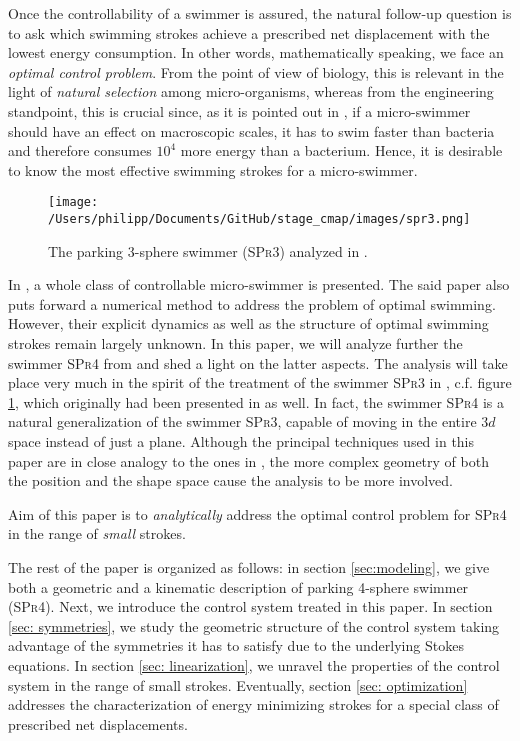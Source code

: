 Once the controllability of a swimmer is assured, the natural follow-up question is to ask which swimming strokes achieve a prescribed net displacement with the lowest energy consumption. In other words, mathematically speaking, we face an \emph{optimal control problem}. From the point of view of biology, this is relevant in the light of \emph{natural selection} among micro-organisms, whereas from the engineering standpoint, this is crucial since, as it is pointed out in \cite{Avron2004}, if a micro-swimmer should have an effect on macroscopic scales, it has to swim faster than bacteria and therefore consumes $10^4$ more energy than a bacterium. Hence, it is desirable to know the most effective swimming strokes for a micro-swimmer.

\begin{figure}[h]
\centering
	\texttt{[image: /Users/philipp/Documents/GitHub/stage\_cmap/images/spr3.png]}
    \caption{The parking 3-sphere swimmer (\textsc{SPr3}) analyzed in \cite{Alouges2017}.}
    \label{fig:spr3}
\end{figure}

In \cite{Alouges2013}, a whole class of controllable micro-swimmer is presented. The said paper also puts forward a numerical method to address the problem of optimal swimming. However, their explicit dynamics as well as the structure of optimal swimming strokes remain largely unknown. In this paper, we will analyze further the swimmer \textsc{SPr4} from \cite{Alouges2013} and shed a light on the latter aspects. The analysis will take place very much in the spirit of the treatment of the swimmer \textsc{SPr3} in \cite{Alouges2017}, c.f. figure \ref{fig:spr3}, which originally had been presented in \cite{Alouges2013} as well. In fact, the swimmer \textsc{SPr4} is a natural generalization of the swimmer \textsc{SPr3}, capable of moving in the entire $3d$ space instead of just a plane. Although the principal techniques used in this paper are in close analogy to the ones in \cite{Alouges2017}, the more complex geometry of both the position and the shape space cause the analysis to be more involved.

Aim of this paper is to \emph{analytically} address the optimal control problem for \textsc{SPr4} in the range of \emph{small} strokes.

The rest of the paper is organized as follows: in section \ref{sec:modeling}, we give both a geometric and a kinematic description of parking 4-sphere swimmer (\textsc{SPr4}). Next, we introduce the control system treated in this paper. In section \ref{sec: symmetries}, we study the geometric structure of the control system taking advantage of the symmetries it has to satisfy due to the underlying Stokes  equations. In section \ref{sec: linearization}, we unravel the properties of the control system in the range of small strokes. Eventually, section \ref{sec: optimization} addresses the characterization of energy minimizing strokes for a special class of prescribed net displacements.




